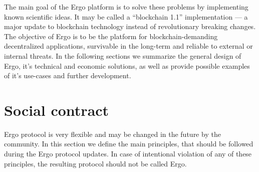 \documentclass[]{article}
\newcommand{\Ergo}{Ergo}
\begin{document}
    The main goal of the Ergo platform is to solve these problems by implementing known scientific ideas.
    It may be called a ``blockchain 1.1'' implementation --- a major update to
    blockchain technology instead of revolutionary breaking changes.
    The objective of Ergo is to be the platform for blockchain-demanding decentralized
    applications, survivable in the long-term and reliable to external or internal threats.
    In the following sections we summarize the general design of Ergo, it's technical and economic solutions,
    as well as provide possible examples of it's use-cases and further development.

    \section{Social contract}
    \label{sec:social}

    \Ergo{} protocol is very flexible and may be changed in the future by the community.
    In this section we define the main principles, that should be followed during the \Ergo{} protocol updates.
    In case of intentional violation of any of these principles, the resulting protocol should not
    be called \Ergo{}.
\end{document}
